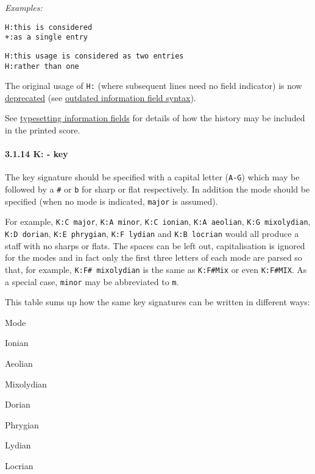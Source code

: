 \emph{Examples:}

\begin{verbatim}
H:this is considered
+:as a single entry
\end{verbatim}

\begin{verbatim}
H:this usage is considered as two entries
H:rather than one
\end{verbatim}

The original usage of \texttt{H:} (where subsequent lines need no field
indicator) is now \protect\hyperlink{outdated_syntax}{deprecated} (see
\protect\hyperlink{outdated_information_field_syntax}{outdated
information field syntax}).

See \protect\hyperlink{typesetting_information_fields}{typesetting
information fields} for details of how the history may be included in
the printed score.

\hypertarget{kkey}{\paragraph{3.1.14 K: - key}\label{kkey}}

The key signature should be specified with a capital letter
(\texttt{A-G}) which may be followed by a \texttt{\#} or \texttt{b} for
sharp or flat respectively. In addition the mode should be specified
(when no mode is indicated, \texttt{major} is assumed).

For example, \texttt{K:C\ major}, \texttt{K:A\ minor},
\texttt{K:C\ ionian}, \texttt{K:A\ aeolian}, \texttt{K:G\ mixolydian},
\texttt{K:D\ dorian}, \texttt{K:E\ phrygian}, \texttt{K:F\ lydian} and
\texttt{K:B\ locrian} would all produce a staff with no sharps or flats.
The spaces can be left out, capitalisation is ignored for the modes and
in fact only the first three letters of each mode are parsed so that,
for example, \texttt{K:F\#\ mixolydian} is the same as \texttt{K:F\#Mix}
or even \texttt{K:F\#MIX}. As a special case, \texttt{minor} may be
abbreviated to \texttt{m}.

This table sums up how the same key signatures can be written in
different ways:

Mode

Ionian

Aeolian

Mixolydian

Dorian

Phrygian

Lydian

Locrian

